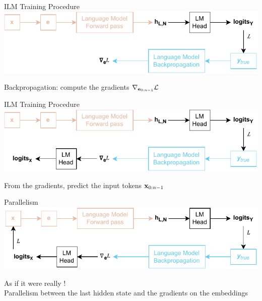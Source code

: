 \begin{frame}[noframenumbering]{ILM Training Procedure}
    \includegraphics[width=\linewidth]{assets/grad_lm_head_parallelism_5.drawio.pdf}
    \vspace{1.5cm}
    
    \centering
    Backpropagation: compute the gradients $\nabla_{\mathbf{e}_{0:n-1}} \mathcal{L}$
\end{frame}

\begin{frame}[noframenumbering]{ILM Training Procedure}
    \includegraphics[width=\linewidth]{assets/grad_lm_head_parallelism_6.drawio.pdf}
    \vspace{1.5cm}
    
    \centering
    From the gradients, predict the input tokens $\mathbf{x}_{0:n-1}$
\end{frame}

\begin{frame}[noframenumbering]{Parallelism}
    \includegraphics[width=\linewidth]{assets/grad_lm_head_parallelism.drawio.pdf}
    \vspace{1.5cm}
    
    \centering
    As if it were really ! \\
    Parallelism between the last hidden state and the gradients on the embeddings
\end{frame}

